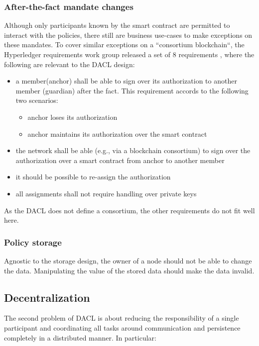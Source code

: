 \documentclass[12pt, conference]{IEEEtran}
\begin{document}
\subsubsection{After-the-fact mandate changes}

Although only participants known by the smart contract are permitted to interact with the policies, there still are business use-cases to make exceptions on these mandates. To cover similar exceptions on a ``consortium blockchain``, the Hyperledger requirements work group released a set of 8 requirements \cite{a1}, where the following are relevant to the DACL design:

\begin{itemize}
\item{a member(anchor) shall be able to sign over its authorization to another member (guardian) after the fact. This requirement accords to the following two scenarios:
    \begin{itemize}    
    \item     {anchor loses its authorization}
    \item {anchor maintains its authorization over the smart contract}
    \end{itemize}
}
\item the network shall be able (e.g., via a blockchain consortium) to sign over the authorization over a smart contract from anchor to another member
\item it should be possible to re-assign the authorization
\item all assignments shall not require handling over private keys
\end{itemize}

As the DACL does not define a consortium, the other requirements do not fit well here.

\subsubsection{Policy storage}

Agnostic to the storage design, the owner of a node should not be able to change the data. Manipulating the value of the stored data should make the data invalid.


\subsection{Decentralization}

The second problem of DACL is about reducing the responsibility of a single participant and coordinating all tasks around communication and persistence completely in a distributed manner. In particular:
\end{document}
